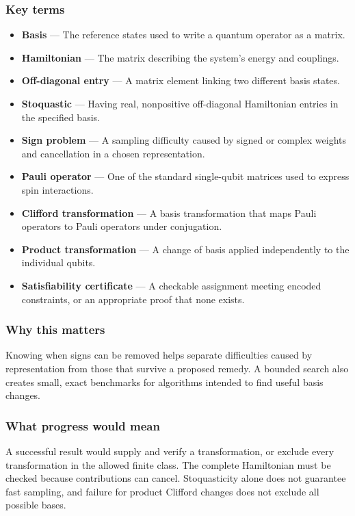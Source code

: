 \documentclass[
  11pt,
]{article}
\newcounter{none} %
\begin{document}
\subsubsection{Key terms}

\begin{itemize}
\item
  \textbf{Basis} --- The reference states used to write a quantum
  operator as a matrix.
\item
  \textbf{Hamiltonian} --- The matrix describing the system's energy and
  couplings.
\item
  \textbf{Off-diagonal entry} --- A matrix element linking two different
  basis states.
\item
  \textbf{Stoquastic} --- Having real, nonpositive off-diagonal
  Hamiltonian entries in the specified basis.
\item
  \textbf{Sign problem} --- A sampling difficulty caused by signed or
  complex weights and cancellation in a chosen representation.
\item
  \textbf{Pauli operator} --- One of the standard single-qubit matrices
  used to express spin interactions.
\item
  \textbf{Clifford transformation} --- A basis transformation that maps
  Pauli operators to Pauli operators under conjugation.
\item
  \textbf{Product transformation} --- A change of basis applied
  independently to the individual qubits.
\item
  \textbf{Satisfiability certificate} --- A checkable assignment meeting
  encoded constraints, or an appropriate proof that none exists.
\end{itemize}

\subsubsection{Why this matters}

Knowing when signs can be removed helps separate difficulties caused by
representation from those that survive a proposed remedy. A bounded
search also creates small, exact benchmarks for algorithms intended to
find useful basis changes.

\subsubsection{What progress would mean}

A successful result would supply and verify a transformation, or exclude
every transformation in the allowed finite class. The complete
Hamiltonian must be checked because contributions can cancel.
Stoquasticity alone does not guarantee fast sampling, and failure for
product Clifford changes does not exclude all possible bases.
\end{document}
